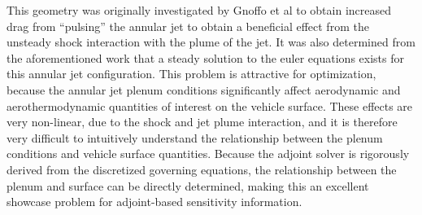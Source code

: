This geometry was originally investigated by Gnoffo et
al\cite{gnoffo2016tapping} to obtain increased drag from ``pulsing'' the annular
jet to obtain a beneficial effect from the unsteady shock interaction with the
plume of the jet.  It was also determined from the aforementioned work that a
steady solution to the euler equations exists for this annular jet
configuration.  This problem is attractive for optimization, because the annular
jet plenum conditions significantly affect aerodynamic and aerothermodynamic
quantities of interest on the vehicle surface.  These effects are very
non-linear, due to the shock and jet plume interaction, and it is therefore very
difficult to intuitively understand the relationship between the plenum
conditions and vehicle surface quantities.  Because the adjoint solver is
rigorously derived from the discretized governing equations, the relationship
between the plenum and surface can be directly determined, making this an
excellent showcase problem for adjoint-based sensitivity information.

